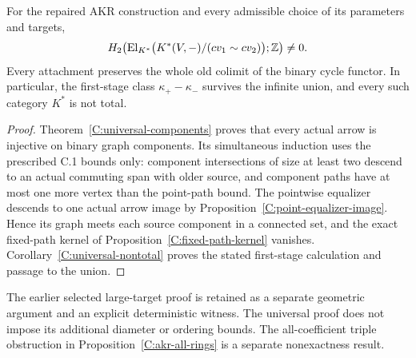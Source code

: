 \begin{theorem}\label{C:survival-question}
For the repaired AKR construction and every admissible choice of its
parameters and targets,
\[
 H_2\!\left(\operatorname{El}_{K^*}
 \bigl(K^*(V,-)/(cv_1\sim cv_2)\bigr);\mathbb Z\right)\ne0.
\]
Every attachment preserves the whole old colimit of the binary cycle
functor. In particular, the first-stage class
$\kappa_+-\kappa_-$ survives the infinite union, and every such
category $K^*$ is not total.
\end{theorem}
\begin{proof}
Theorem~\ref{C:universal-components} proves that every actual arrow
is injective on binary graph components. Its simultaneous induction
uses the prescribed C.1 bounds only: component intersections of
size at least two descend to an actual commuting span with older
source, and component paths have at most one more vertex than the
point-path bound. The pointwise equalizer descends to one actual
arrow image by Proposition~\ref{C:point-equalizer-image}. Hence its
graph meets each source component in a connected set, and the
exact fixed-path kernel of Proposition~\ref{C:fixed-path-kernel}
vanishes. Corollary~\ref{C:universal-nontotal} proves the stated
first-stage calculation and passage to the union.
\end{proof}
The earlier selected large-target proof is retained as a separate
geometric argument and an explicit deterministic witness. The
universal proof does not impose its additional diameter or ordering
bounds. The all-coefficient triple obstruction in
Proposition~\ref{C:akr-all-rings} is a separate nonexactness result.

